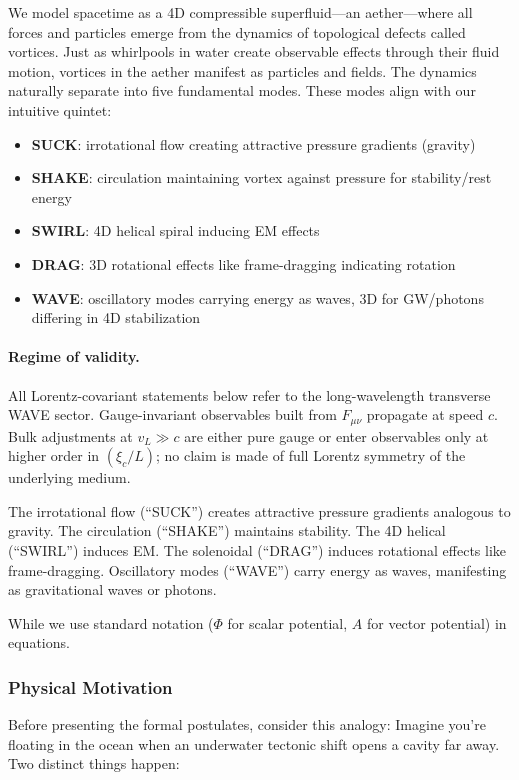 We model spacetime as a 4D compressible superfluid---an aether---where all forces and particles emerge from the dynamics of topological defects called vortices. Just as whirlpools in water create observable effects through their fluid motion, vortices in the aether manifest as particles and fields. The dynamics naturally separate into five fundamental modes. These modes align with our intuitive quintet:
\begin{itemize}
\item \textbf{SUCK}: irrotational flow creating attractive pressure gradients (gravity)
\item \textbf{SHAKE}: circulation maintaining vortex against pressure for stability/rest energy
\item \textbf{SWIRL}: 4D helical spiral inducing EM effects
\item \textbf{DRAG}: 3D rotational effects like frame-dragging indicating rotation
\item \textbf{WAVE}: oscillatory modes carrying energy as waves, 3D for GW/photons differing in 4D stabilization
\end{itemize}
\paragraph{Regime of validity.} All Lorentz-covariant statements below refer to the long-wavelength transverse WAVE sector. Gauge-invariant observables built from $F_{\mu\nu}$ propagate at speed $c$. Bulk adjustments at $v_L\gg c$ are either pure gauge or enter observables only at higher order in $(\xi_c/L)$; no claim is made of full Lorentz symmetry of the underlying medium.

The irrotational flow (``SUCK'') creates attractive pressure gradients analogous to gravity. The circulation (``SHAKE'') maintains stability. The 4D helical (``SWIRL'') induces EM. The solenoidal (``DRAG'') induces rotational effects like frame-dragging. Oscillatory modes (``WAVE'') carry energy as waves, manifesting as gravitational waves or photons.

While we use standard notation ($\Phi$ for scalar potential, $A$ for vector potential) in equations.

\subsubsection{Physical Motivation}

Before presenting the formal postulates, consider this analogy: Imagine you're floating in the ocean when an underwater tectonic shift opens a cavity far away. Two distinct things happen:

